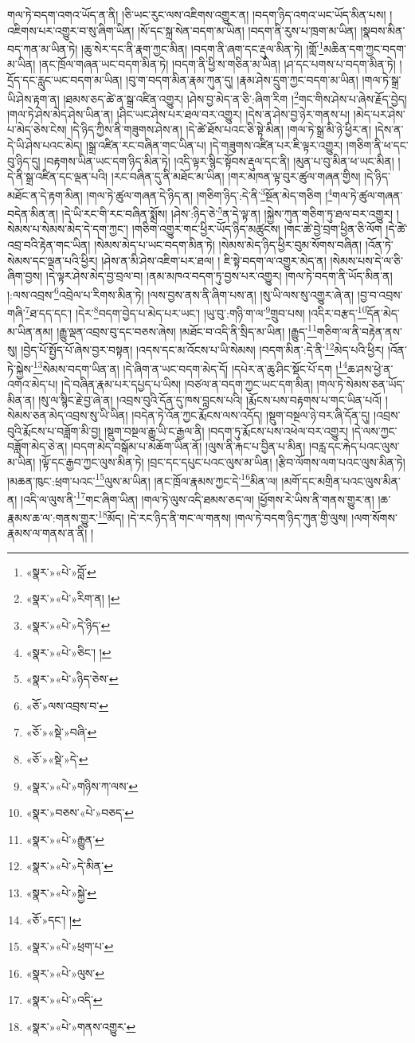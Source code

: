 གལ་ཏེ་བདག་འགའ་ཡོད་ན་ནི། །ཅི་ཡང་རུང་ལས་འཇིགས་འགྱུར་ན། །བདག་ཉིད་འགའ་ཡང་ཡོད་མིན་པས། །འཇིགས་པར་འགྱུར་བ་སུ་ཞིག་ཡིན། །སོ་དང་སྐྲ་སེན་བདག་མ་ཡིན། །བདག་ནི་རུས་པ་ཁྲག་མ་ཡིན། །སྣབས་མིན་བད་ཀན་མ་ཡིན་ཏེ། །ཆུ་སེར་དང་ནི་རྣག་ཀྱང་མིན། །བདག་ནི་ཞག་དང་རྡུལ་མིན་ཏེ། །གློ་\footnote{«སྣར་»«པེ་»བློ་}མཆིན་དག་ཀྱང་བདག་མ་ཡིན། །ནང་ཁྲོལ་གཞན་ཡང་བདག་མིན་ཏེ། །བདག་ནི་ཕྱི་ས་གཅིན་མ་ཡིན། །ཤ་དང་པགས་པ་བདག་མིན་ཏེ། །དྲོད་དང་རླུང་ཡང་བདག་མ་ཡིན། །བུ་ག་བདག་མིན་རྣམ་ཀུན་དུ། །རྣམ་ཤེས་དྲུག་ཀྱང་བདག་མ་ཡིན། །གལ་ཏེ་སྒྲ་ཡི་ཤེས་རྟག་ན། །ཐམས་ཅད་ཚེ་ན་སྒྲ་འཛིན་འགྱུར། །ཤེས་བྱ་མེད་ན་ཅི་:ཞིག་རིག །\footnote{«སྣར་»«པེ་»རིག་ན། །}གང་གིས་ཤེས་པ་ཞེས་རྗོད་བྱེད། །གལ་ཏེ་ཤེས་མེད་ཤེས་ཡིན་ན། །ཤིང་ཡང་ཤེས་པར་ཐལ་བར་འགྱུར། །དེས་ན་ཤེས་བྱ་ཉེར་གནས་པ། །མེད་པར་ཤེས་པ་མེད་ཅེས་ངེས། །དེ་ཉིད་ཀྱིས་ནི་གཟུགས་ཤེས་ན། །དེ་ཚེ་ཐོས་པའང་ཅི་སྟེ་མིན། །གལ་ཏེ་སྒྲ་མི་ཉེ་ཕྱིར་ན། །དེས་ན་དེ་ཡི་ཤེས་པའང་མེད། །སྒྲ་འཛིན་རང་བཞིན་གང་ཡིན་པ། །དེ་གཟུགས་འཛིན་པར་ཇི་ལྟར་འགྱུར། །གཅིག་ནི་ཕ་དང་བུ་ཉིད་དུ། །བརྟགས་ཡིན་ཡང་དག་ཉིད་མིན་ཏེ། །འདི་ལྟར་སྙིང་སྟོབས་རྡུལ་དང་ནི། །མུན་པ་བུ་མིན་ཕ་ཡང་མིན། །དེ་ནི་སྒྲ་འཛིན་དང་ལྡན་པའི། །རང་བཞིན་དུ་ནི་མཐོང་མ་ཡིན། །གར་མཁན་ལྟ་བུར་ཚུལ་གཞན་གྱིས། །དེ་ཉིད་མཐོང་ན་དེ་རྟག་མིན། །གལ་ཏེ་ཚུལ་གཞན་དེ་ཉིད་ན། །གཅིག་ཉིད་:དེ་ནི་\footnote{«སྣར་»«པེ་»དེ་ཉིད་}སྔོན་མེད་གཅིག །\footnote{«སྣར་»«པེ་»ཅིང་། །}གལ་ཏེ་ཚུལ་གཞན་བདེན་མིན་ན། །དེ་ཡི་རང་གི་རང་བཞིན་སྨྲོས། །ཤེས་:ཉིད་ཅེ་\footnote{«སྣར་»«པེ་»ཉིད་ཅེས་}ན་དེ་ལྟ་ན། །སྐྱེས་ཀུན་གཅིག་ཏུ་ཐལ་བར་འགྱུར། །སེམས་པ་སེམས་མེད་དེ་དག་ཀྱང་། །གཅིག་འགྱུར་གང་ཕྱིར་ཡོད་ཉིད་མཚུངས། །གང་ཚེ་བྱེ་བྲག་ཕྱིན་ཅི་ལོག །དེ་ཚེ་འབྲ་བའི་རྟེན་གང་ཡིན། །སེམས་མེད་པ་ཡང་བདག་མིན་ཏེ། །སེམས་མེད་ཉིད་ཕྱིར་བུམ་སོགས་བཞིན། །འོན་ཏེ་སེམས་དང་ལྡན་པའི་ཕྱིར། །ཤེས་ན་མི་ཤེས་འཇིག་པར་ཐལ། །
ཇི་སྟེ་བདག་ལ་འགྱུར་མེད་ན། །སེམས་པས་དེ་ལ་ཅི་ཞིག་བྱས། །དེ་ལྟར་ཤེས་མེད་བྱ་བྲལ་བ། །ནམ་མཁའ་བདག་ཏུ་བྱས་པར་འགྱུར། །གལ་ཏེ་བདག་ནི་ཡོད་མིན་ན། །:ལས་འབྲས་\footnote{«ཅོ་»ལས་འབྲས་བ་}འབྲེལ་པ་རིགས་མིན་ཏེ། །ལས་བྱས་ནས་ནི་ཞིག་པས་ན། །སུ་ཡི་ལས་སུ་འགྱུར་ཞེ་ན། །བྱ་བ་འབྲས་གཞི་\footnote{«ཅོ་»«སྡེ་»བཞི་}ཐ་དད་དང་། །དེར་\footnote{«ཅོ་»«སྡེ་»དེ་}བདག་བྱེད་པ་མེད་པར་ཡང་། །ཡུ་བུ་:གཉི་ག་ལ་\footnote{«སྣར་»«པེ་»གཉིས་ཀ་ལས་}གྲུབ་པས། །འདིར་བརྩད་\footnote{«སྣར་»བཅས་«པེ་»བཅད་}དོན་མེད་མ་ཡིན་ནམ། །རྒྱུ་ལྡན་འབྲས་བུ་དང་བཅས་ཞེས། །མཐོང་བ་འདི་ནི་སྲིད་མ་ཡིན། །རྒྱུད་\footnote{«སྣར་»«པེ་»རྒྱུན་}གཅིག་ལ་ནི་བརྟེན་ནས་སུ། །བྱེད་པོ་སྤྱོད་པོ་ཞེས་བྱར་བསྟན། །འདས་དང་མ་འོངས་པ་ཡི་སེམས། །བདག་མིན་:དེ་ནི་\footnote{«སྣར་»«པེ་»དེ་མིན་}མེད་པའི་ཕྱིར། །འོན་ཏེ་སྐྱེས་\footnote{«སྣར་»«པེ་»སྐྱེ་}སེམས་བདག་ཡིན་ན། །དེ་ཞིག་ན་ཡང་བདག་མེད་དོ། །དཔེར་ན་ཆུ་ཤིང་སྡོང་པོ་དག །\footnote{«ཅོ་»དང་། །}ཆ་ཤས་ཕྱེ་ན་འགའ་མེད་པ། །དེ་བཞིན་རྣམ་པར་དཔྱད་པ་ཡིས། །བཙལ་ན་བདག་ཀྱང་ཡང་དག་མིན། །གལ་ཏེ་སེམས་ཅན་ཡོད་མིན་ན། །སུ་ལ་སྙིང་རྗེ་བྱ་ཞེ་ན། །འབྲས་བུའི་དོན་དུ་ཁས་བླངས་པའི། །རྨོངས་པས་བརྟགས་པ་གང་ཡིན་པའོ། །སེམས་ཅན་མེད་འབྲས་སུ་ཡི་ཡིན། །བདེན་ཏེ་འོན་ཀྱང་རྨོངས་ལས་འདོད། །སྡུག་བསྔལ་ཉེ་བར་ཞི་དོན་དུ། །འབྲས་བུའི་རྨོངས་པ་བཟློག་མི་བྱ། །སྡུག་བསྔལ་རྒྱུ་ཡི་ང་རྒྱལ་ནི། །བདག་ཏུ་རྨོངས་པས་འཕེལ་བར་འགྱུར། །དེ་ལས་ཀྱང་བཟློག་མེད་ཅེ་ན། །བདག་མེད་བསྒོམ་པ་མཆོག་ཡིན་ནོ། །ལུས་ནི་རྐང་པ་བྱིན་པ་མིན། །བརླ་དང་རྐེད་པའང་ལུས་མ་ཡིན། །ལྟོ་དང་རྒྱབ་ཀྱང་ལུས་མིན་ཏེ། །བྲང་དང་དཔུང་པའང་ལུས་མ་ཡིན། །རྩིབ་ལོགས་ལག་པའང་ལུས་མིན་ཏེ། །མཆན་ཁུང་:ཕྲག་པའང་\footnote{«སྣར་»«པེ་»ཕྲག་པ་}ལུས་མ་ཡིན། །ནང་ཁྲོལ་རྣམས་ཀྱང་དེ་\footnote{«སྣར་»«པེ་»ལུས་}མིན་ལ། །མགོ་དང་མགྲིན་པའང་ལུས་མིན་ན། །འདི་ལ་ལུས་ནི་\footnote{«སྣར་»«པེ་»འདི་}གང་ཞིག་ཡིན། །གལ་ཏེ་ལུས་འདི་ཐམས་ཅད་ལ། །ཕྱོགས་རེ་ཡིས་ནི་གནས་གྱུར་ན། །ཆ་རྣམས་ཆ་ལ་:གནས་གྱུར་\footnote{«སྣར་»«པེ་»གནས་འགྱུར་}མོད། །དེ་རང་ཉིད་ནི་གང་ལ་གནས། །གལ་ཏེ་བདག་ཉིད་ཀུན་གྱི་ལུས། །ལག་སོགས་རྣམས་ལ་གནས་ན་ནི། །
